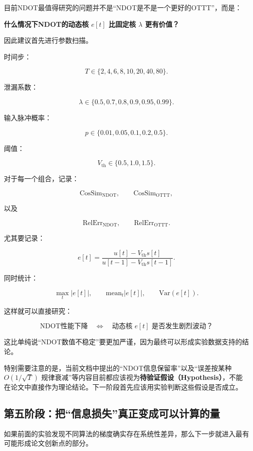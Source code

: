 \documentclass[journal,12pt,onecolumn]{IEEEtran}
\begin{document}
目前NDOT最值得研究的问题并不是“NDOT是不是一个更好的OTTT”，而是：

\begin{center}
\textbf{什么情况下NDOT的动态核 \(e[t]\) 比固定核 \(\lambda\) 更有价值？}
\end{center}

因此建议首先进行参数扫描。

时间步：

\[
T\in\{2,4,6,8,10,20,40,80\}.
\]

泄漏系数：

\[
\lambda\in\{0.5,0.7,0.8,0.9,0.95,0.99\}.
\]

输入脉冲概率：

\[
p\in\{0.01,0.05,0.1,0.2,0.5\}.
\]

阈值：

\[
V_{\mathrm{th}}\in\{0.5,1.0,1.5\}.
\]

对于每一个组合，记录：

\[
\mathrm{CosSim}_{\mathrm{NDOT}},
\qquad
\mathrm{CosSim}_{\mathrm{OTTT}},
\]

以及

\[
\mathrm{RelErr}_{\mathrm{NDOT}},
\qquad
\mathrm{RelErr}_{\mathrm{OTTT}}.
\]

尤其要记录：

\[
e[t]
=
\frac{
u[t]-V_{\mathrm{th}}s[t]
}{
u[t-1]-V_{\mathrm{th}}s[t-1]
}.
\]

同时统计：

\[
\max_t |e[t]|,
\qquad
\mathrm{mean}_t|e[t]|,
\qquad
\mathrm{Var}(e[t]).
\]

这样就可以直接研究：

\[
\boxed{
\text{NDOT性能下降}
\quad\Longleftrightarrow\quad
\text{动态核 }e[t]\text{ 是否发生剧烈波动？}
}
\]

这比单纯说“NDOT数值不稳定”要更加严谨，因为最终可以形成实验数据支持的结论。

特别需要注意的是，当前文档中提出的“NDOT信息保留率”以及“误差按某种 \(O(1/\sqrt{T})\) 规律衰减”等内容目前都应该视为\textbf{待验证假设（Hypothesis）}，不能在论文中直接作为理论结论。下一阶段首先应该用实验判断这些假设是否成立。


\subsection{第五阶段：把“信息损失”真正变成可以计算的量}

如果前面的实验发现不同算法的梯度确实存在系统性差异，那么下一步就进入最有可能形成论文创新点的部分。
\end{document}
